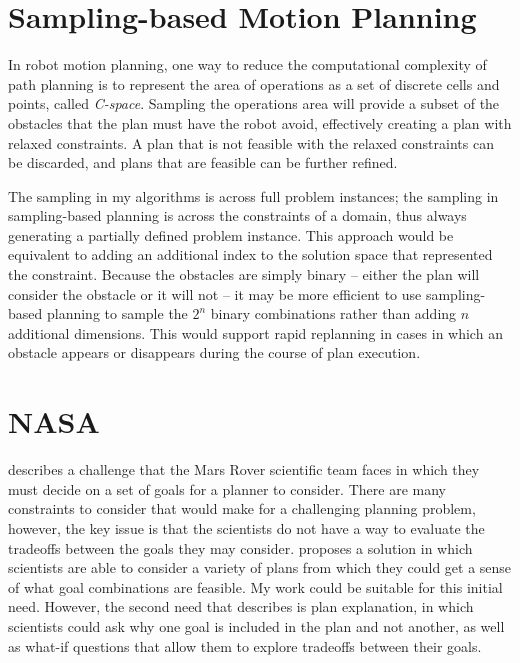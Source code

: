 \section{Sampling-based Motion Planning}

In robot motion planning, one way to reduce the computational complexity of path planning is to represent the area of operations as a set of discrete cells and points, called \textit{C-space}.  Sampling the operations area will provide a subset of the obstacles that the plan must have the robot avoid, effectively creating a plan with relaxed constraints.  A plan that is not feasible with the relaxed constraints can be discarded, and plans that are feasible can be further refined.  

The sampling in my algorithms is across full problem instances; the sampling in sampling-based planning is across the constraints of a domain, thus always generating a partially defined problem instance.  This approach would be equivalent to adding an additional index to the solution space that represented the constraint.  Because the obstacles are simply binary -- either the plan will consider the obstacle or it will not -- it may be more efficient to use sampling-based planning to sample the $2^n$ binary combinations rather than adding $n$ additional dimensions.  This would support rapid replanning in cases in which an obstacle appears or disappears during the course of plan execution.

\section{NASA}

\cite{DBLP:conf/aaai/Smith12} describes a challenge that the Mars Rover scientific team faces in which they must decide on a set of goals for a planner to consider.  There are many constraints to consider that would make for a challenging planning problem, however, the key issue is that the scientists do not have a way to evaluate the tradeoffs between the goals they may consider.  \citeauthor{DBLP:conf/aaai/Smith12} proposes a solution in which scientists are able to consider a variety of plans from which they could get a sense of what goal combinations are feasible.  My work could be suitable for this initial need.  However, the second need that \citeauthor{DBLP:conf/aaai/Smith12} describes is plan explanation, in which scientists could ask why one goal is included in the plan and not another, as well as what-if questions that allow them to explore tradeoffs between their goals.  


